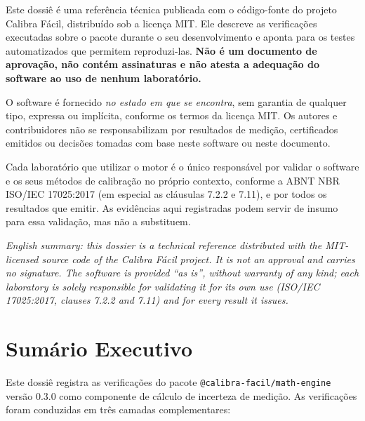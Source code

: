 \documentclass[11pt,a4paper]{article}
\newcommand{\docVersion}{0.3.0}
\begin{document}
Este dossiê é uma referência técnica publicada com o código-fonte do projeto Calibra Fácil, distribuído sob a licença MIT. Ele descreve as verificações executadas sobre o pacote durante o seu desenvolvimento e aponta para os testes automatizados que permitem reproduzi-las. \textbf{Não é um documento de aprovação, não contém assinaturas e não atesta a adequação do software ao uso de nenhum laboratório.}

O software é fornecido \emph{no estado em que se encontra}, sem garantia de qualquer tipo, expressa ou implícita, conforme os termos da licença MIT. Os autores e contribuidores não se responsabilizam por resultados de medição, certificados emitidos ou decisões tomadas com base neste software ou neste documento.

Cada laboratório que utilizar o motor é o único responsável por validar o software e os seus métodos de calibração no próprio contexto, conforme a ABNT NBR ISO/IEC 17025:2017 (em especial as cláusulas 7.2.2 e 7.11), e por todos os resultados que emitir. As evidências aqui registradas podem servir de insumo para essa validação, mas não a substituem.

\vspace{0.2cm}
{\small\itshape English summary: this dossier is a technical reference distributed with the MIT-licensed source code of the Calibra Fácil project. It is not an approval and carries no signature. The software is provided ``as is'', without warranty of any kind; each laboratory is solely responsible for validating it for its own use (ISO/IEC 17025:2017, clauses 7.2.2 and 7.11) and for every result it issues.}

\tableofcontents

\clearpage

\section{Sumário Executivo}

Este dossiê registra as verificações do pacote \texttt{@calibra-facil/math-engine} versão \docVersion{} como componente de cálculo de incerteza de medição. As verificações foram conduzidas em três camadas complementares:
\end{document}
